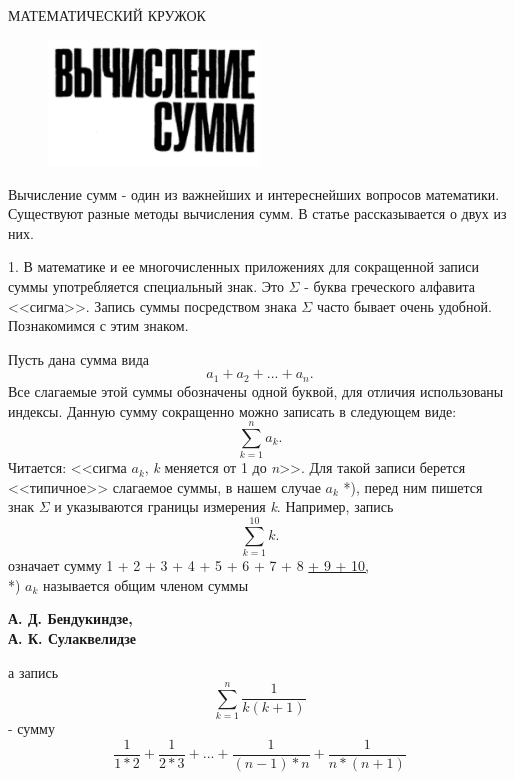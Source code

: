 \newpage
\begingroup
	\begin{center}
	\large{МАТЕМАТИЧЕСКИЙ КРУЖОК}
	\end{center}
\endgroup

\begin{multicols}{2}
\begin{figure}[H]
\includegraphics[width = 0.5\textwidth]{image}
\end{figure}

 \vspace*{10mm}
\setcounter{page}{37}
\begin{textbf}
{Вычисление сумм - один из важнейших и интереснейших
вопросов математики. Существуют разные методы вычисления сумм.
В статье рассказывается о двух из них. 
} 
\end{textbf}

1. В математике и ее многочисленных приложениях для сокращенной записи суммы употребляется специальный знак. 
Это $\Sigma$ - буква греческого алфавита  <<сигма>>. Запись суммы посредством знака $\Sigma$ часто бывает очень удобной.
Познакомимся с этим знаком. 

Пусть дана сумма вида \\
$$a_1 + a_2 + ... + a_n.$$
Все слагаемые этой суммы обозначены одной буквой, для отличия использованы индексы.
Данную сумму сокращенно можно записать в следующем виде:
$$\sum_{k=1}^{n} a_k.$$
Читается: <<сигма $a_k$, \textit{k} меняется от 1 до \textit{n}>>. Для такой записи берется <<типичное>> слагаемое
суммы, в нашем случае $a_k$ *), перед ним пишется знак $\Sigma$ и указываются границы измерения \textit{k}. Например, запись
$$\sum_{k=1}^{10} k.$$
означает сумму 1 + 2 + 3 + 4 + 5 + 6 + 7 + 8 \underline{+ 9 + 10,} \\
\small{*) $a_k$ называется общим членом суммы}\\
\begin{flushright}
\textbf{А. Д. Бендукиндзе, \\
А. К. Сулаквелидзе}
\end{flushright}
 \vspace*{55mm}
а запись
$$\sum_{k=1}^{n} \frac{1}{k(k+1)}$$
- сумму
$$\frac{1}{1*2} + \frac{1}{2*3} + ... + \frac{1}{(n-1)*n} + \frac{1}{n*(n+1)}$$


\end{multicols}
